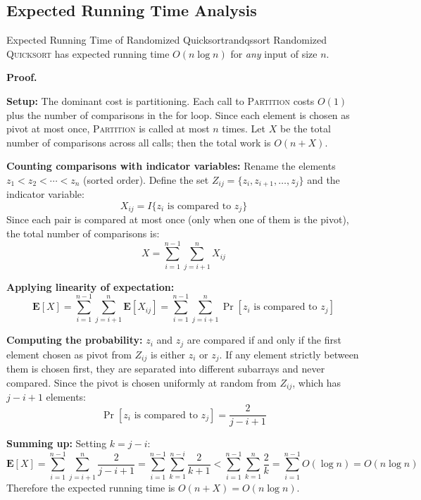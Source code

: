 \subsection{Expected Running Time Analysis}

\begin{theorem}{Expected Running Time of Randomized Quicksort}{randqssort}
Randomized \textsc{Quicksort} has expected running time $O(n \log n)$ for \emph{any} input of
size $n$.

\textbf{Proof.}

\textbf{Setup:} The dominant cost is partitioning. Each call to \textsc{Partition} costs
$O(1)$ plus the number of comparisons in the for loop. Since each element is chosen as pivot
at most once, \textsc{Partition} is called at most $n$ times. Let $X$ be the total number of
comparisons across all calls; then the total work is $O(n + X)$.

\textbf{Counting comparisons with indicator variables:} Rename the elements $z_1 < z_2 <
\cdots < z_n$ (sorted order). Define the set $Z_{ij} = \{z_i, z_{i+1}, \ldots, z_j\}$ and
the indicator variable:
\[
  X_{ij} = I\{z_i \text{ is compared to } z_j\}
\]
Since each pair is compared at most once (only when one of them is the pivot), the total
number of comparisons is:
\[
  X = \sum_{i=1}^{n-1} \sum_{j=i+1}^{n} X_{ij}
\]

\textbf{Applying linearity of expectation:}
\[
  \mathbf{E}[X]
  = \sum_{i=1}^{n-1} \sum_{j=i+1}^{n} \mathbf{E}[X_{ij}]
  = \sum_{i=1}^{n-1} \sum_{j=i+1}^{n} \Pr[z_i \text{ is compared to } z_j]
\]

\textbf{Computing the probability:} $z_i$ and $z_j$ are compared if and only if the first
element chosen as pivot from $Z_{ij}$ is either $z_i$ or $z_j$. If any element strictly
between them is chosen first, they are separated into different subarrays and never compared.
Since the pivot is chosen uniformly at random from $Z_{ij}$, which has $j - i + 1$ elements:
\[
  \Pr[z_i \text{ is compared to } z_j] = \frac{2}{j - i + 1}
\]

\textbf{Summing up:} Setting $k = j - i$:
\[
  \mathbf{E}[X]
  = \sum_{i=1}^{n-1} \sum_{j=i+1}^{n} \frac{2}{j-i+1}
  = \sum_{i=1}^{n-1} \sum_{k=1}^{n-i} \frac{2}{k+1}
  < \sum_{i=1}^{n-1} \sum_{k=1}^{n} \frac{2}{k}
  = \sum_{i=1}^{n-1} O(\log n)
  = O(n \log n)
\]
Therefore the expected running time is $O(n + X) = O(n \log n)$.
\end{theorem}

